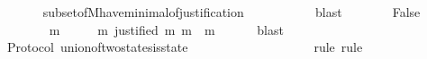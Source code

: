 \begin{isabellebody}
\ \ \ \ \ \ \isamarkupfalse%
\ subset{\isacharunderscore}of{\isacharunderscore}M{\isacharunderscore}have{\isacharunderscore}minimal{\isacharunderscore}of{\isacharunderscore}justification\ {\isacartoucheopen}{\isasymsigma}{\isacharprime}\ {\isasymsubset}\ {\isasymsigma}{\isacartoucheclose}\isanewline
\ \ \ \ \ \ \isamarkupfalse%
\ blast\isanewline
\ \ \ \ \isamarkupfalse%
\ \isamarkupfalse%
\ False\isanewline
\ \ \ \ \ \ \isamarkupfalse%
\ {\isacartoucheopen}{\isasymforall}\ m\ {\isasymin}\ {\isasymsigma}\ {\isacharminus}\ {\isasymsigma}{\isacharprime}{\isachardot}\ {\isasymexists}\ m{\isacharprime}{\isachardot}\ justified\ m{\isacharprime}\ m\ {\isasymand}\ m{\isacharprime}\ {\isasymin}\ {\isasymsigma}\ {\isacharminus}\ {\isasymsigma}{\isacharprime}{\isacartoucheclose}\ \isamarkupfalse%
\ blast\isanewline
\ \ \isamarkupfalse%
\isanewline
{}\isamarkupfalse%
%
\endisatagproof
{\isafoldproof}%
%
\isadelimproof
\isanewline
%
\endisadelimproof
\isanewline
{}\isamarkupfalse%
\ {\isacharparenleft}\ Protocol{\isacharparenright}\ union{\isacharunderscore}of{\isacharunderscore}two{\isacharunderscore}states{\isacharunderscore}is{\isacharunderscore}state\ {\isacharcolon}\isanewline
\ \ {\isachardoublequoteopen}{\isasymforall}\ {\isasymsigma}{}\ {\isasymin}\ {\isasymSigma}{\isachardot}\ {\isasymforall}\ {\isasymsigma}{}\ {\isasymin}\ {\isasymSigma}{\isachardot}\ {\isacharparenleft}{\isasymsigma}{}\ {\isasymunion}\ {\isasymsigma}{}{\isacharparenright}\ {\isasymin}\ {\isasymSigma}{\isachardoublequoteclose}\isanewline
%
\isadelimproof
\ \ %
\endisadelimproof
%
\isatagproof
{}\isamarkupfalse%
\ {\isacharparenleft}rule{\isacharcomma}\ rule{\isacharparenright}\isanewline
{}\isamarkupfalse%
\ {\isacharminus}\ \isanewline
\ \ \isamarkupfalse%
\ {\isasymsigma}{}\ {\isasymsigma}{}\isanewline
\ \ \isamarkupfalse%
\ {\isachardoublequoteopen}{\isasymsigma}{}\ {\isasymin}\ {\isasymSigma}{\isachardoublequoteclose}\ \ {\isachardoublequoteopen}{\isasymsigma}{}\ {\isasymin}\ {\isasymSigma}{\isachardoublequoteclose}\isanewline
\ \ \isamarkupfalse%
\ {\isachardoublequoteopen}{\isasymsigma}{}\ {\isasymunion}\ {\isasymsigma}{}\ {\isasymin}\ {\isasymSigma}{\isachardoublequoteclose}\isanewline
\ \ \isamarkupfalse%

\end{isabellebody}
